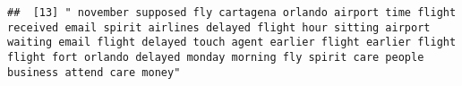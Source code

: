 \documentclass[
]{article}
\begin{document}
\begin{verbatim}
##  [13] " november supposed fly cartagena orlando airport time flight received email spirit airlines delayed flight hour sitting airport waiting email flight delayed touch agent earlier flight earlier flight flight fort orlando delayed monday morning fly spirit care people business attend care money"                                                                                                                                                                                                                                                                                                                                                                                                                                                                                                                                                                                                                                                                                                                                                                                                                                                                                                                                                                                                                                                                                                                                                                                                                                                                                                                                                                                                                                                                                           

\end{verbatim}
\end{document}
